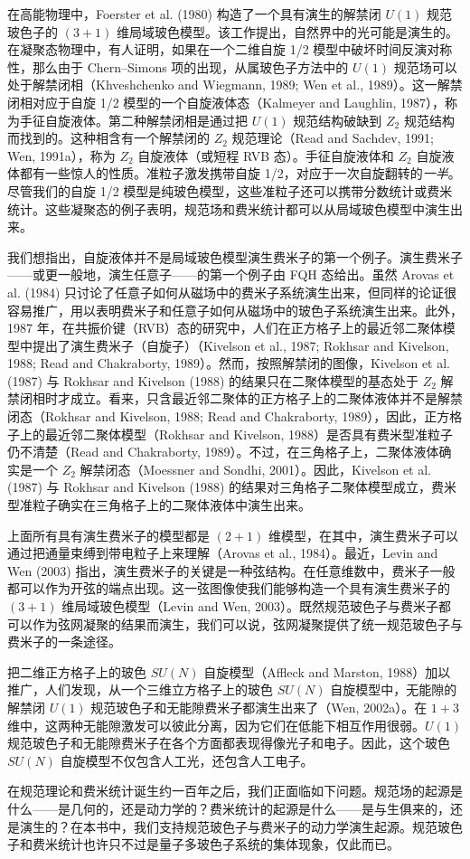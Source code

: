 在高能物理中，Foerster et al. (1980) 构造了一个具有演生的解禁闭 $U(1)$ 规范玻色子的 $(3+1)$ 维局域玻色模型。该工作提出，自然界中的光可能是演生的。在凝聚态物理中，有人证明，如果在一个二维自旋 1/2 模型中破坏时间反演对称性，那么由于 Chern--Simons 项的出现，从属玻色子方法中的 $U(1)$ 规范场可以处于解禁闭相（Khveshchenko and Wiegmann, 1989; Wen et al., 1989）。这一解禁闭相对应于自旋 1/2 模型的一个自旋液体态（Kalmeyer and Laughlin, 1987），称为手征自旋液体。第二种解禁闭相是通过把 $U(1)$ 规范结构破缺到 $Z_2$ 规范结构而找到的。这种相含有一个解禁闭的 $Z_2$ 规范理论（Read and Sachdev, 1991; Wen, 1991a），称为 $Z_2$ 自旋液体（或短程 RVB 态）。手征自旋液体和 $Z_2$ 自旋液体都有一些惊人的性质。准粒子激发携带自旋 1/2，对应于一次自旋翻转的\emph{一半}。尽管我们的自旋 1/2 模型是纯玻色模型，这些准粒子还可以携带分数统计或费米统计。这些凝聚态的例子表明，规范场和费米统计都可以从局域玻色模型中演生出来。

我们想指出，自旋液体并不是局域玻色模型演生费米子的第一个例子。演生费米子——或更一般地，演生任意子——的第一个例子由 FQH 态给出。虽然 Arovas et al. (1984) 只讨论了任意子如何从磁场中的费米子系统演生出来，但同样的论证很容易推广，用以表明费米子和任意子如何从磁场中的玻色子系统演生出来。此外，1987 年，在共振价键（RVB）态的研究中，人们在正方格子上的最近邻二聚体模型中提出了演生费米子（自旋子）（Kivelson et al., 1987; Rokhsar and Kivelson, 1988; Read and Chakraborty, 1989）。然而，按照解禁闭的图像，Kivelson et al. (1987) 与 Rokhsar and Kivelson (1988) 的结果只在二聚体模型的基态处于 $Z_2$ 解禁闭相时才成立。看来，只含最近邻二聚体的正方格子上的二聚体液体并不是解禁闭态（Rokhsar and Kivelson, 1988; Read and Chakraborty, 1989），因此，正方格子上的最近邻二聚体模型（Rokhsar and Kivelson, 1988）是否具有费米型准粒子仍不清楚（Read and Chakraborty, 1989）。不过，在三角格子上，二聚体液体确实是一个 $Z_2$ 解禁闭态（Moessner and Sondhi, 2001）。因此，Kivelson et al. (1987) 与 Rokhsar and Kivelson (1988) 的结果对三角格子二聚体模型成立，费米型准粒子确实在三角格子上的二聚体液体中演生出来。

上面所有具有演生费米子的模型都是 $(2+1)$ 维模型，在其中，演生费米子可以通过把通量束缚到带电粒子上来理解（Arovas et al., 1984）。最近，Levin and Wen (2003) 指出，演生费米子的关键是一种弦结构。在任意维数中，费米子一般都可以作为开弦的端点出现。这一弦图像使我们能够构造一个具有演生费米子的 $(3+1)$ 维局域玻色模型（Levin and Wen, 2003）。既然规范玻色子与费米子都可以作为弦网凝聚的结果而演生，我们可以说，弦网凝聚提供了统一规范玻色子与费米子的一条途径。

把二维正方格子上的玻色 $SU(N)$ 自旋模型（Affleck and Marston, 1988）加以推广，人们发现，从一个三维立方格子上的玻色 $SU(N)$ 自旋模型中，无能隙的解禁闭 $U(1)$ 规范玻色子和无能隙费米子都演生出来了（Wen, 2002a）。在 $1+3$ 维中，这两种无能隙激发可以彼此分离，因为它们在低能下相互作用很弱。$U(1)$ 规范玻色子和无能隙费米子在各个方面都表现得像光子和电子。因此，这个玻色 $SU(N)$ 自旋模型不仅包含人工光，还包含人工电子。

在规范理论和费米统计诞生约一百年之后，我们正面临如下问题。规范场的起源是什么——是几何的，还是动力学的？费米统计的起源是什么——是与生俱来的，还是演生的？在本书中，我们支持规范玻色子与费米子的动力学演生起源。规范玻色子和费米统计也许只不过是量子多玻色子系统的集体现象，仅此而已。
